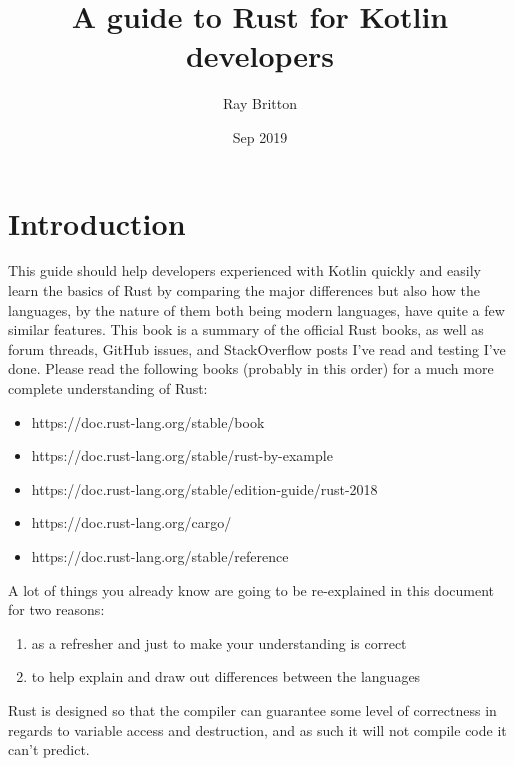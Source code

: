 \documentclass[a4paper,11pt]{article}
\begin{document}
\lstset{basicstyle=\ttfamily\footnotesize,breaklines=true}
\lstset{language=Rust, style=colouredRust}
\setlength{\parindent}{0mm}
\sffamily

\title{A guide to Rust for Kotlin developers}
\author{Ray Britton}
\date{Sep 2019}

\maketitle

\newpage
{}
\tableofcontents

\newpage
{}
\section{Introduction}

This guide should help developers experienced with Kotlin quickly and easily learn the basics of Rust by comparing the major differences but also how the languages, by the nature of them both being modern languages, have quite a few similar features.
\newline
\newline
This book is a summary of the official Rust books, as well as forum threads, GitHub issues, and StackOverflow posts I've read and testing I've done.
Please read the following books (probably in this order) for a much more complete understanding of Rust:
\begin{itemize}
  \item https://doc.rust-lang.org/stable/book
  \item https://doc.rust-lang.org/stable/rust-by-example
  \item https://doc.rust-lang.org/stable/edition-guide/rust-2018
  \item https://doc.rust-lang.org/cargo/
  \item https://doc.rust-lang.org/stable/reference
\end{itemize}
A lot of things you already know are going to be re-explained in this document for two reasons:
\begin{enumerate}
	\item as a refresher and just to make your understanding is correct
	\item to help explain and draw out differences between the languages
\end{enumerate}
Rust is designed so that the compiler can guarantee some level of correctness in regards to variable access and destruction, and as such it will not compile code it can't predict.
\end{document}
